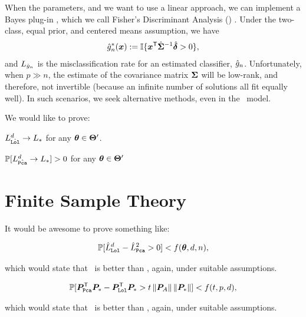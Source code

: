\documentclass[10pt]{article}
\begin{document}
When the parameters, and we want to use a linear approach, we can implement a Bayes plug-in \Lda, which we call Fisher's Discriminant Analysis (\Fld) \cite{Fisher1925a}.  Under the two-class, equal prior, and centered means assumption, we have
\begin{align}
\hat{g}^*_n(\boldsymbol{x}) := \mathbb{I}\{ \boldsymbol{x}^{\mathsf{T}} \hat{\boldsymbol{\Sigma}}^{-1} \hat{\boldsymbol{\delta}} > 0 \},
\end{align}
and $L_{\hat{g}_n}$ is the misclassification rate for an estimated classifier, $\hat{g}_n$.
Unfortunately, when $p \gg n$, the estimate of the covariance matrix $\boldsymbol{\Sigma}$ will be low-rank, and therefore, not invertible (because an infinite number of solutions all fit equally well).  In such scenarios, we seek alternative methods, even in the \Lda~model.

We would like to prove:
\begin{lem}
$L_{\hat{{\sc \texttt{Lol}}}}^d \rightarrow L_*$ for any $\boldsymbol{\theta} \in \boldsymbol{\Theta}'$.
\end{lem}


\begin{lem}
$\mathbb{P}[L_{\hat{{\sc \texttt{Pca}}}}^d \rightarrow L_*]>0$ for any $\boldsymbol{\theta} \in \boldsymbol{\Theta}'$
\end{lem}

\newpage
\section{Finite Sample Theory}

It would be awesome to prove something like:
\begin{thm}
\begin{align*}
\mathbb{P}[ \hat{L}_{{\sc \texttt{Lol}}}^d - \hat{L}_{{\sc \texttt{Pca}}}^2  > 0  ] < f(\boldsymbol{\theta},d,n),
\end{align*}
\end{thm}
which would state that \Lol~is better than \Pca, again, under suitable assumptions.


\begin{thm}
\begin{align*}
\mathbb{P}[ \boldsymbol{P}_{{\sc \texttt{Pca}}} ^{\mathsf{T}} \boldsymbol{P}_*  - \boldsymbol{P}_{{\sc \texttt{Lol}}} ^{\mathsf{T}} \boldsymbol{P}_*  > t \left \lVert\boldsymbol{P}_A \right \rVert \left \lVert\boldsymbol{P}_* \right \rVert ] < f(t,p,d),
\end{align*}
\end{thm}
which would state that \Lol~is better than \Pca, again, under suitable assumptions.
\end{document}
